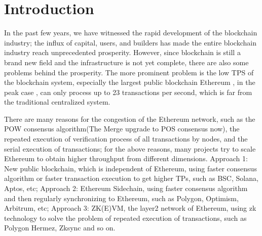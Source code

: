 \section{Introduction}\label{sec:introduction}

In the past few years, we have witnessed the rapid development of the blockchain industry; 
the influx of capital, users, and builders has made the entire blockchain industry reach 
unprecedented prosperity. However, since blockchain is still a brand new field and the
infrastructure is not yet complete, there are also some problems behind the prosperity. 
The more prominent problem is the low TPS of the blockchain system, especially the largest public
blockchain Ethereum \cite{website:Ethereum}, in the peak case \cite{website:Etherscan-chart}, can only process up to 23 
transactions per second, which is far from the traditional centralized system. 

There are many reasons for the congestion of the Ethereum\cite{website:Ethereum} network, such as the POW\cite{website:POW} 
consensus algorithm(The Merge upgrade\cite{website:The-Merge} to POS\cite{website:POS} consensus now), the repeated execution of 
verification process of all transactions by nodes, and the serial execution of transactions; 
for the above reasons, many projects try to scale Ethereum to obtain higher throughput from different dimensions. Approach 1: New public blockchain, 
which is independent of Ethereum\cite{website:Ethereum}, 
using faster consensus algorithm or faster transaction execution to get higher TPs, such as BSC\cite{website:BSC}, Solana\cite{website:Solana}, 
Aptos\cite{website:Aptos}, etc; Approach 2: Ethereum\cite{website:Ethereum} Sidechain, using faster consensus
algorithm and then regularly synchronizing to Ethereum\cite{website:Ethereum}, such as Polygon\cite{website:Polygon}, Optimism\cite{website:Optimism}, Arbitrum\cite{website:Arbitrum},
etc; Approach 3: ZK(E)VM, the layer2 network of Ethereum\cite{website:Ethereum}, using zk technology to 
solve the problem of repeated execution of transactions, such as Polygon Hermez\cite{website:Polygon-Hermez}, 
Zksync\cite{website:Zksync} and so on.

